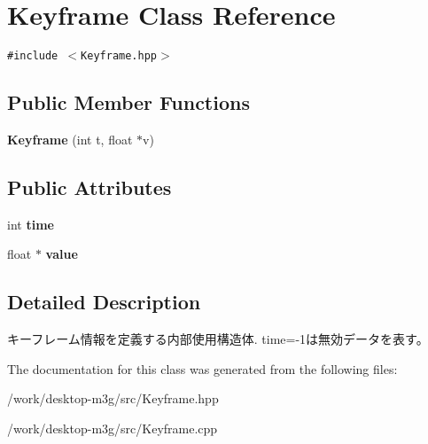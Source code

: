 \hypertarget{classm3g_1_1Keyframe}{
\section{Keyframe Class Reference}
\label{classm3g_1_1Keyframe}
}
{\tt \#include $<$Keyframe.hpp$>$}

\subsection*{Public Member Functions}
\begin{CompactItemize}
\item 
\hypertarget{classm3g_1_1Keyframe_8d7b239b0b22e155001b100c80a9680b}{
\textbf{Keyframe} (int t, float $\ast$v)}
\label{classm3g_1_1Keyframe_8d7b239b0b22e155001b100c80a9680b}

\end{CompactItemize}
\subsection*{Public Attributes}
\begin{CompactItemize}
\item 
\hypertarget{classm3g_1_1Keyframe_42715f65f02da52edc5b22021d8ae670}{
int \textbf{time}}
\label{classm3g_1_1Keyframe_42715f65f02da52edc5b22021d8ae670}

\item 
\hypertarget{classm3g_1_1Keyframe_b8d14ba2f5911cadc861b9b89ae0c605}{
float $\ast$ \textbf{value}}
\label{classm3g_1_1Keyframe_b8d14ba2f5911cadc861b9b89ae0c605}

\end{CompactItemize}


\subsection{Detailed Description}
キーフレーム情報を定義する内部使用構造体. time=-1は無効データを表す。 

The documentation for this class was generated from the following files:\begin{CompactItemize}
\item 
/work/desktop-m3g/src/Keyframe.hpp\item 
/work/desktop-m3g/src/Keyframe.cpp\end{CompactItemize}

